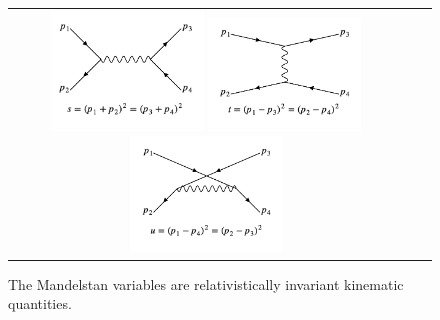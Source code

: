 \begin{figure}[!htb]
  \begin{center}
    \begin{tabular}{ccc}
      \includegraphics[width=0.4\textwidth]{images/web_feynman/image_17.png}
      \includegraphics[width=0.4\textwidth]{images/web_feynman/image_18.png}
      \includegraphics[width=0.4\textwidth]{images/web_feynman/image_19.png}
    \end{tabular}
    \caption[Mandelstan variables]{The Mandelstan variables are relativistically invariant kinematic quantities.}
    \label{fig:ch5_mandelstan}
  \end{center}
\end{figure}


